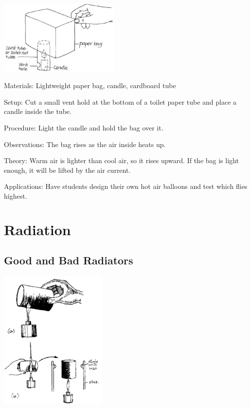 \begin{multicols}{2}
\begin{center}
\includegraphics[width=0.45\textwidth]{./img/vso/hot-air-balloon.png}
\end{center}

\begin{description*}
\item[Materials:]{Lightweight paper bag, candle, cardboard tube}
\item[Setup:]{Cut a small vent hold at the bottom of a toilet paper tube and place a candle inside the tube.}
\item[Procedure:]{Light the candle and hold the bag over it.}
\item[Observations:]{The bag rises as the air inside heats up.}
\item[Theory:]{Warm air is lighter than cool air, so it rises upward. If the bag is light enough, it will be lifted by the air current.}
\item[Applications:]{Have students design their own hot air balloons and test which flies highest.}
\end{description*}


\section*{Radiation}


\subsection{Good and Bad Radiators}

\begin{center}
\includegraphics[width=0.4\textwidth]{./img/source/good-bad-radiators.png}
\end{center}


\end{multicols}
